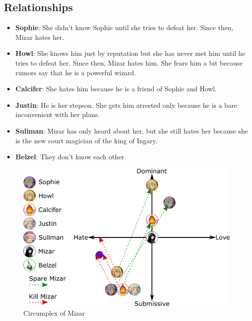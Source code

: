 \subsection{Relationships}
\begin{itemize}
\item \textbf{Sophie}: She didn’t know Sophie until she tries to defeat her. Since then, Mizar hates her.
\item \textbf{Howl}: She knows him just by reputation but she has never met him until he tries to defeat her. Since then, Mizar hates him. She fears him a bit because rumors say that he is a powerful wizard.
\item \textbf{Calcifer}: She hates him because he is a friend of Sophie and Howl.
\item \textbf{Justin}: He is her stepson. She gets him arrested only because he is a bare  inconvenient with her plans. 
\item \textbf{Suliman}: Mizar has only heard about her, but she still hates her because she is the new court magician of the king of Ingary.
\item \textbf{Belzel}: They don't know each other.
\end{itemize}

\begin{figure}[H]
  \centering
  \includegraphics[width=14cm]{Images/Diagrams/Circumplexes/mizarCircumplex}
  \caption{Circumplex of Mizar}
\end{figure}

